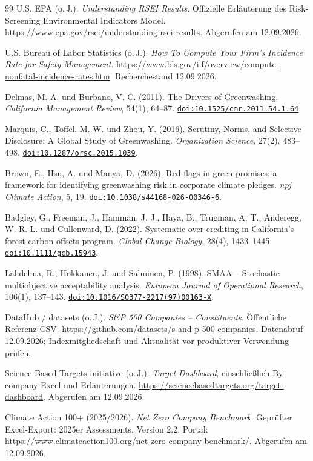 \documentclass[11pt,a4paper]{article}
\newcommand{\doi}[1]{\href{https://doi.org/#1}{\nolinkurl{doi:#1}}}
\begin{document}
\begin{thebibliography}{99}
 U.S. EPA (o.\,J.). \emph{Understanding RSEI Results}. Offizielle Erläuterung des Risk-Screening Environmental Indicators Model. \url{https://www.epa.gov/rsei/understanding-rsei-results}. Abgerufen am 12.09.2026.

 U.S. Bureau of Labor Statistics (o.\,J.). \emph{How To Compute Your Firm's Incidence Rate for Safety Management}. \url{https://www.bls.gov/iif/overview/compute-nonfatal-incidence-rates.htm}. Recherchestand 12.09.2026.

 Delmas, M. A. und Burbano, V. C. (2011). The Drivers of Greenwashing. \emph{California Management Review}, 54(1), 64--87. \doi{10.1525/cmr.2011.54.1.64}.

 Marquis, C., Toffel, M. W. und Zhou, Y. (2016). Scrutiny, Norms, and Selective Disclosure: A Global Study of Greenwashing. \emph{Organization Science}, 27(2), 483--498. \doi{10.1287/orsc.2015.1039}.

 Brown, E., Hsu, A. und Manya, D. (2026). Red flags in green promises: a framework for identifying greenwashing risk in corporate climate pledges. \emph{npj Climate Action}, 5, 19. \doi{10.1038/s44168-026-00346-6}.

 Badgley, G., Freeman, J., Hamman, J. J., Haya, B., Trugman, A. T., Anderegg, W. R. L. und Cullenward, D. (2022). Systematic over-crediting in California's forest carbon offsets program. \emph{Global Change Biology}, 28(4), 1433--1445. \doi{10.1111/gcb.15943}.

 Lahdelma, R., Hokkanen, J. und Salminen, P. (1998). SMAA -- Stochastic multiobjective acceptability analysis. \emph{European Journal of Operational Research}, 106(1), 137--143. \doi{10.1016/S0377-2217(97)00163-X}.

 DataHub / datasets (o.\,J.). \emph{S\&P 500 Companies -- Constituents}. Öffentliche Referenz-CSV. \url{https://github.com/datasets/s-and-p-500-companies}. Datenabruf 12.09.2026; Indexmitgliedschaft und Aktualität vor produktiver Verwendung prüfen.

 Science Based Targets initiative (o.\,J.). \emph{Target Dashboard}, einschließlich By-company-Excel und Erläuterungen. \url{https://sciencebasedtargets.org/target-dashboard}. Abgerufen am 12.09.2026.

 Climate Action 100+ (2025/2026). \emph{Net Zero Company Benchmark}. Geprüfter Excel-Export: 2025er Assessments, Version 2.2. Portal: \url{https://www.climateaction100.org/net-zero-company-benchmark/}. Abgerufen am 12.09.2026.


\end{thebibliography}
\end{document}
